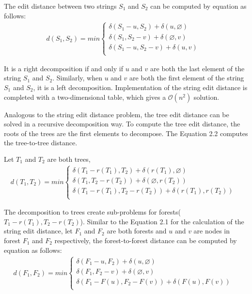 The edit distance between two strings $S_1$ and $S_2$ can be computed by equation as follows:
\begin{align}
d(S_1, S_2) = min \begin{cases}
	  	\delta(S_1 - u , S_2) + \delta(u, \varnothing) \\ 
      	\delta(S_1, S_2 - v) + \delta(\varnothing, v) \\ 
    	\delta(S_1 - u, S_2 - v) + \delta(u, v) & \\ 
    \end{cases}
\end{align}

It is a right decomposition if and only if $u$ and $v$ are both the last element of the string $S_1$ and $S_2$. Similarly, when $u$ and $v$ are both the first element of the string $S_1$ and $S_2$, it is a left decomposition. Implementation of the string edit distance is completed with a two-dimensional table, which gives a $\mathcal{O}(n^2)$ solution.

Analogous to the string edit distance problem, the tree edit distance can be solved in a recursive decomposition way. To compute the tree edit distance,  the roots of the trees are the first elements to decompose. The Equation 2.2 computes the tree-to-tree distance.

Let $T_1$ and $T_2$ are both trees, 
\begin{align}
d(T_1, T_2) = min \begin{cases}
	  	\delta(T_1 - r(T_1) , T_2) + \delta(r(T_1), \varnothing) \\ 
      	\delta(T_1, T_2 - r(T_2)) + \delta(\varnothing, r(T_2)) \\ 
    	\delta(T_1 - r(T_1), T_2 - r(T_2)) + \delta(r(T_1), r(T_2)) & \\
    \end{cases}
\end{align}

The decomposition to trees create sub-problems for forests($T_1 - r(T_1), T_2 - r(T_2)$). Similar to the Equation 2.1 for the calculation of the string edit distance, let $F_1$ and $F_2$ are both forests and $u$ and $v$ are nodes in forest $F_1$ and $F_2$ respectively, the forest-to-forest distance can be computed by equation as follows: 
\begin{align}
d(F_1, F_2) = min \begin{cases}
	  	\delta(F_1 - u , F_2) + \delta(u, \varnothing) \\ 
      	\delta(F_1, F_2 - v) + \delta(\varnothing, v) \\ 
    	\delta(F_1 - F(u), F_2 - F(v)) + \delta(F(u), F(v))& \\ 
    \end{cases}
\end{align}

